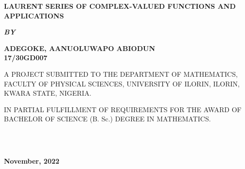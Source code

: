 \documentclass[11pt]{report}
\newcommand{\bt}[1]{\textbf{#1}}
\begin{document}
	
	\clearpage
	\thispagestyle{empty}
	\begin{center}
		\Large \bt{LAURENT SERIES OF COMPLEX-VALUED FUNCTIONS AND APPLICATIONS}
	\end{center}

	\hspace{7cm}
	
	\begin{center}
		\textbf{\textit{BY}}
	\end{center}
	
	\hspace{5cm}
	
	\begin{center}
		\large \textbf{ADEGOKE, AANUOLUWAPO ABIODUN
			\\
			17/30GD007}
	\end{center}
	
	\hspace{9cm}
	
	\begin{center}
		A PROJECT SUBMITTED TO THE DEPARTMENT OF MATHEMATICS, FACULTY OF PHYSICAL SCIENCES, UNIVERSITY OF ILORIN, ILORIN, KWARA STATE, NIGERIA.
	\end{center}

	\hspace{7cm}
	
	\begin{center}
		IN PARTIAL FULFILLMENT OF REQUIREMENTS FOR THE AWARD OF BACHELOR OF SCIENCE (B. Sc.) DEGREE IN MATHEMATICS.
	\end{center}
	\hspace{5cm}
	\\ \\ 
	\begin{center}
		\textbf{November, 2022}
	\end{center}

	\newpage
\end{document}
